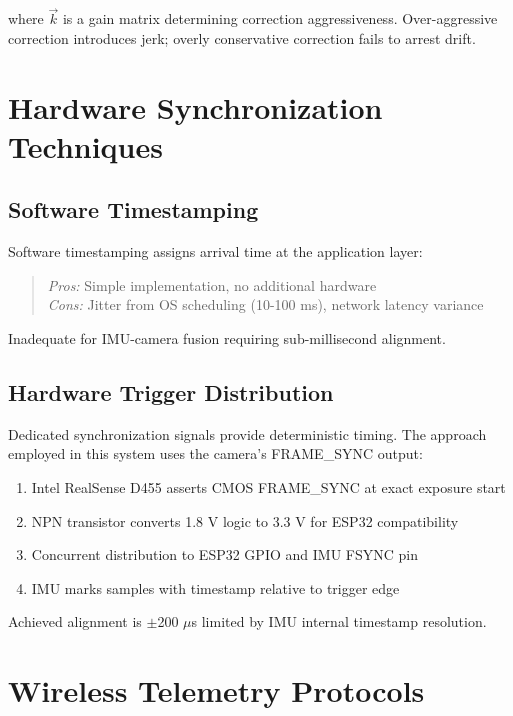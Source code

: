 where $\vec{k}$ is a gain matrix determining correction aggressiveness. Over-aggressive correction introduces jerk; overly conservative correction fails to arrest drift.

\section{Hardware Synchronization Techniques}

\subsection{Software Timestamping}

Software timestamping assigns arrival time at the application layer:

\begin{quote}
\textit{Pros:} Simple implementation, no additional hardware\\
\textit{Cons:} Jitter from OS scheduling (10-100 ms), network latency variance
\end{quote}

Inadequate for IMU-camera fusion requiring sub-millisecond alignment.

\subsection{Hardware Trigger Distribution}

Dedicated synchronization signals provide deterministic timing. The approach employed in this system uses the camera's FRAME\_SYNC output:

\begin{enumerate}
    \item Intel RealSense D455 asserts CMOS FRAME\_SYNC at exact exposure start
    \item NPN transistor converts 1.8 V logic to 3.3 V for ESP32 compatibility
    \item Concurrent distribution to ESP32 GPIO and IMU FSYNC pin
    \item IMU marks samples with timestamp relative to trigger edge
\end{enumerate}

Achieved alignment is $\pm$200 $\mu$s limited by IMU internal timestamp resolution.

\section{Wireless Telemetry Protocols}

